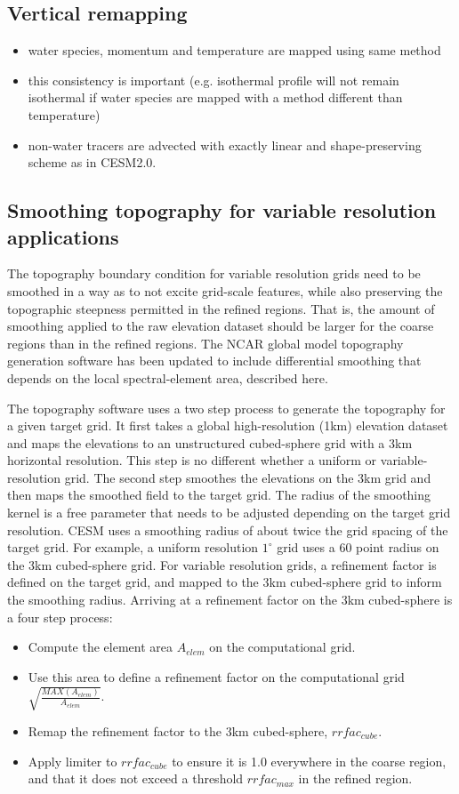 \documentclass[draft]{agujournal2019}
\begin{document}
\subsection{Vertical remapping}
\begin{itemize}
\item water species, momentum and temperature are mapped using same method
\item this consistency is important (e.g. isothermal profile will not remain isothermal if water species are mapped with a method different than temperature)
\item non-water tracers are advected with exactly linear and shape-preserving scheme as in CESM2.0.
\end{itemize}
\subsection{Smoothing topography for variable resolution applications}
The topography boundary condition for variable resolution grids need to be smoothed in a way as to not excite grid-scale features, while also preserving the topographic steepness permitted in the refined regions. That is, the amount of smoothing applied to the raw elevation dataset should be larger for the coarse regions than in the refined regions. The NCAR global model topography generation software \cite{LetAl2015GMD} has been updated to include differential smoothing that depends on the local spectral-element area, described here. 

The topography software uses a two step process to generate the topography for a given target grid. It first takes a global high-resolution (1km) elevation dataset and maps the elevations to an unstructured cubed-sphere grid with a 3km horizontal resolution. This step is no different whether a uniform or variable-resolution grid. The second step smoothes the elevations on the 3km grid and then maps the smoothed field to the target grid. The radius of the smoothing kernel is a free parameter that needs to be adjusted depending on the target grid resolution. CESM uses a smoothing radius of about twice the grid spacing of the target grid. For example, a uniform resolution $1^{\circ}$ grid uses a 60 point radius on the 3km cubed-sphere grid. For variable resolution grids, a refinement factor is defined on the target grid, and mapped to the 3km cubed-sphere grid to inform the smoothing radius. Arriving at a refinement factor on the 3km cubed-sphere is a four step process:
\begin{itemize}
\item Compute the element area $A_{elem}$ on the computational grid.
\item Use this area to define a refinement factor on the computational grid $\sqrt{\frac{MAX(A_{elem})}{A_{elem}}}$.
\item Remap the refinement factor to the 3km cubed-sphere, $rrfac_{cube}$.
\item Apply limiter to $rrfac_{cube}$ to ensure it is 1.0 everywhere in the coarse region, and that it does not exceed a threshold $rrfac_{max}$ in the refined region.
\end{itemize}
\end{document}
